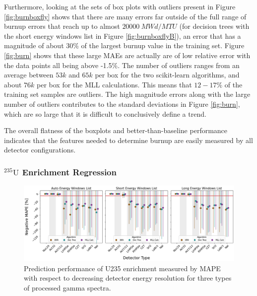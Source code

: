 Furthermore, looking at the sets of box plots with outliers present in Figure
\ref{fig:burnboxfly} shows that there are many errors far outside of the full
range of burnup errors that reach up to almost $20000\:MWd/MTU$ (for decision
trees with the short energy windows list in Figure \ref{fig:burnboxflyB}), an
error that has a magnitude of about 30\% of the largest burnup value in the
training set.  Figure \ref{fig:burn} shows that these large \gls{MAE}s are
actually are of low relative error with the data points all being above -1.5\%.
The number of outliers ranges from an average between $53k$ and $65k$ per box
for the two scikit-learn algorithms, and about $76k$ per box for the \gls{MLL}
calculations.  This means that $12-17\%$ of the training set samples are
outliers.  The high magnitude errors along with the large number of outliers
contributes to the standard deviations in Figure \ref{fig:burn}, which are so
large that it is difficult to conclusively define a trend.

The overall flatness of the boxplots and better-than-baseline performance
indicates that the features needed to determine burnup are easily measured by
all detector configurations. 

\subsubsection{\texorpdfstring{${}^{235}\text{U}$}{U-235} Enrichment Regression}

\begin{figure}[!htb]
  \centering
  \includegraphics[width=\textwidth]{./chapters/exp2/detector_preds_wrt_enlist_MAPE_enri.png}
  \caption[Prediction performance of \acrshort{U235} regression with decreasing 
           detector energy resolution]
          {Prediction performance of \acrshort{U235} enrichment measured by 
           \acrshort{MAPE} with respect to decreasing detector energy resolution
           for three types of processed gamma spectra.}
  \label{fig:enri}
\end{figure}

